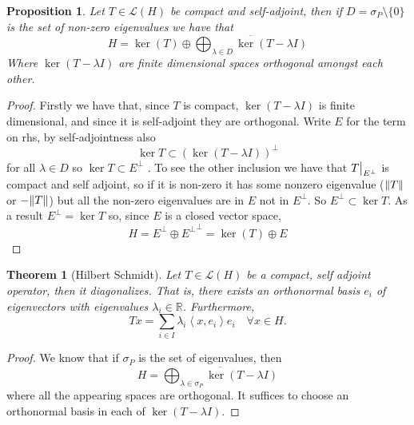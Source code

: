 \documentclass[12pt]{article}
\newcommand{\br}[1]{\left\langle#1\right\rangle}
\newcommand\restr[2]{{\left.\kern-\nulldelimiterspace #1\vphantom{\big|} \right|_{#2}}}
\newcommand{\R}{{\mathbb R}}
\newtheorem{theorem}{Theorem}
\newtheorem{proposition}{Proposition}
\begin{document}
\begin{proposition}
	Let $T\in\mathcal{L}(H)$ be compact and self-adjoint, then if $D=\sigma_P\setminus\{0\}$ is the set of non-zero eigenvalues we have that
	\begin{equation*}
		H=\operatorname{ker}(T) \oplus \overline{\bigoplus_{\lambda \in D} \operatorname{ker}(T-\lambda I)}
	\end{equation*}
	Where $\operatorname{ker}(T-\lambda I)$ are finite dimensional spaces orthogonal amongst each other.
\end{proposition}
\begin{proof}
	Firstly we have that, since $T$ is compact, $\ker(T-\lambda I)$ is finite dimensional, and since it is self-adjoint they are orthogonal. Write $E$ for the term on rhs, by self-adjointness also
	\begin{equation*}
		\ker{T}\subset (\ker(T-\lambda I))^\perp
	\end{equation*}
	for all $\lambda\in D$ so $\ker{T}\subset E^\perp$ . To see the other inclusion we have that $\restr{T}{E^\perp}$ is compact and self adjoint, so if it is non-zero it has some nonzero eigenvalue ($\norm{T}$ or $-\norm{T}$) but all the non-zero eigenvalues are in $E$ not in $E^\perp$. So $E^\perp\subset\ker{T}$. As a result $E^\perp=\ker{T}$ so, since $E$ is a closed vector space,
	\begin{equation*}
		H=E^\perp\oplus {E^\perp}^\perp=\ker(T)\oplus E
	\end{equation*}
\end{proof}
\begin{theorem}[Hilbert Schmidt]\label{Hilber-Schmidt}
	Let $T\in\mathcal{L}(H)$ be a compact, self adjoint operator, then it diagonalizes. That is, there exists an orthonormal basis $e_i$ of eigenvectors with eigenvalues $\lambda_i\in\R$. Furthermore,
	\begin{equation*}
		Tx=\sum_{i\in I} \lambda_i\br{x,e_i}e_i\quad\forall x\in H.
	\end{equation*}
\end{theorem}
\begin{proof}
	We know that if $\sigma_P$ is the set of eigenvalues, then
	\begin{equation*}
		H= \overline{\bigoplus_{\lambda \in \sigma_P} \operatorname{ker}(T-\lambda I)}
	\end{equation*}
	where all the appearing spaces are orthogonal. It suffices to choose an orthonormal basis in each of $\operatorname{ker}(T-\lambda I)$.
\end{proof}
\end{document}
